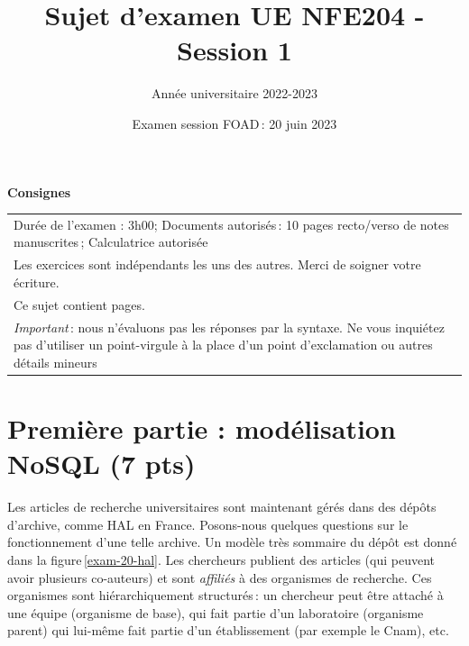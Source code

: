 \documentclass[11pt,a4paper]{article}
\begin{document}
\title{Sujet d'examen UE NFE204 - Session 1}
\author{Année universitaire 2022-2023}
\date{Examen session FOAD\,: 20 juin  2023}

\maketitle

\begin{center}
{\bf \Large Consignes}\\
\begin{tabular}{| p{15cm} |}
\hline
Dur\'ee de l'examen : 3h00; Documents autoris\'es\,: 10 pages recto/verso de
notes manuscrites\,;  Calculatrice autoris\'ee\\

Les exercices sont indépendants les uns des autres. Merci de soigner votre écriture.\\
Ce sujet contient \pageref{LastPage} pages.\\

\textit{Important}\,: nous n'évaluons pas les réponses par la syntaxe. Ne vous
inquiétez pas d'utiliser un point-virgule à la place d'un point d'exclamation ou
autres détails mineurs
\\
\hline
\end{tabular}
\end{center}



\section*{Première partie : modélisation NoSQL (7 pts)}

Les articles de recherche universitaires sont maintenant gérés dans des dépôts
d'archive, comme HAL en France. Posons-nous quelques questions sur le fonctionnement
d'une telle archive.
Un modèle très sommaire du dépôt est donné dans la figure\,\ref{exam-20-hal}. Les chercheurs
publient des articles (qui peuvent avoir plusieurs co-auteurs) et sont \emph{affiliés} à des organismes
de recherche. Ces organismes sont hiérarchiquement structurés\,: un chercheur peut être
attaché à une équipe (organisme de base), qui fait partie d'un laboratoire (organisme
parent) qui lui-même fait partie d'un établissement (par exemple le Cnam), etc.
\end{document}
